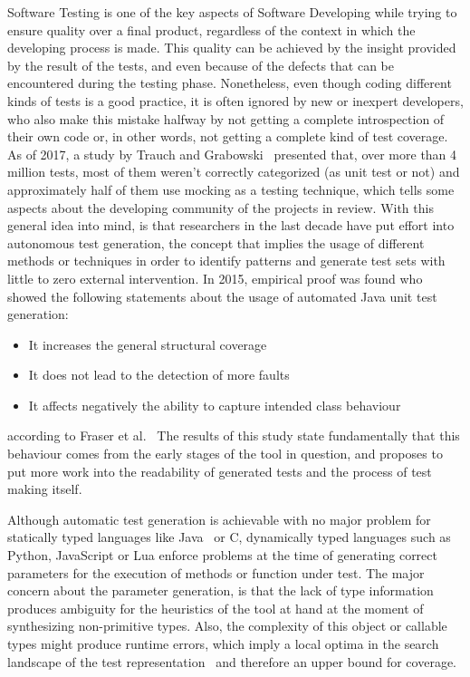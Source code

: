 \documentclass[%
  chapterprefix=false,%
  open=right,%
  twoside=true,%
  paper=a4,%
  logofile={Figures/logo.png},%
  thesistype=master,%
  UKenglish,%
]{se2thesis}
\begin{document}
Software Testing is one of the key aspects of Software Developing while trying to ensure quality over a final product, regardless of the context in which the developing process is made.
This quality can be achieved by the insight provided by the result of the tests, and even because of the defects that can be encountered during the testing phase.
Nonetheless, even though coding different kinds of tests is a good practice, it is often ignored by new or inexpert developers, who also make this mistake halfway by not getting a complete introspection of their own code or, in other words, not getting a complete kind of test coverage.
As of 2017, a study by Trauch and Grabowski~\cite{DBLP:conf/icst/TrautschG17} presented that, over more than 4 million tests, most of them weren't correctly categorized (as unit test or not) and approximately half of them use mocking as a testing technique, which tells some aspects about the developing community of the projects in review. 
With this general idea into mind, is that researchers in the last decade   have put effort into autonomous test generation, the concept that implies the usage of different methods or techniques in order to identify patterns and generate test sets with little to zero   external intervention.
In 2015, empirical proof was found who showed the following statements about the usage of automated Java unit test generation:
\begin{itemize}
  \item It increases the general structural coverage
  \item It does not lead to the detection of more faults
  \item It affects negatively the ability to capture intended class behaviour
\end{itemize}
according to Fraser et al.~\cite{DBLP:journals/tosem/FraserSMAP15}
The results of this study state fundamentally that this behaviour  comes from the early stages of the tool in question, and proposes to put more work into the readability of generated tests and  the process of test making itself.

Although automatic test generation is achievable with no major problem for statically typed languages like Java~\cite{DBLP:journals/tse/FraserA13} or C, dynamically typed languages such as Python, JavaScript or Lua enforce problems at the time of generating correct parameters for the execution of methods or function under test.
The major concern about the parameter generation, is that the lack of type information produces ambiguity for the heuristics of the tool at hand at the moment of synthesizing non-primitive types.
Also, the complexity of this object or callable types might produce runtime errors, which imply a local optima in the search landscape of the test representation~\cite{DBLP:conf/sigsoft/0001O00D21} and therefore an upper bound for coverage.
\end{document}
